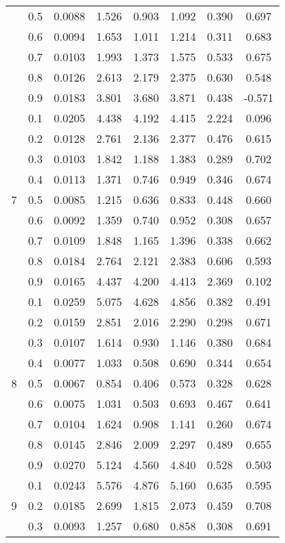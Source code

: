 \documentclass[11pt,a4paper]{report}
\begin{document}
\begin{longtable}{ | c | c || c | c | c | c | c | c | }
 & 0.5 & 0.0088 & 1.526 & 0.903 & 1.092 & 0.390 & 0.697 \\
 & 0.6 & 0.0094 & 1.653 & 1.011 & 1.214 & 0.311 & 0.683 \\
 & 0.7 & 0.0103 & 1.993 & 1.373 & 1.575 & 0.533 & 0.675 \\
 & 0.8 & 0.0126 & 2.613 & 2.179 & 2.375 & 0.630 & 0.548 \\
 & 0.9 & 0.0183 & 3.801 & 3.680 & 3.871 & 0.438 & -0.571 \\
 \hline
\multirow{9}{*}{7} & 0.1 & 0.0205 & 4.438 & 4.192 & 4.415 & 2.224 & 0.096 \\
 & 0.2 & 0.0128 & 2.761 & 2.136 & 2.377 & 0.476 & 0.615 \\
 & 0.3 & 0.0103 & 1.842 & 1.188 & 1.383 & 0.289 & 0.702 \\
 & 0.4 & 0.0113 & 1.371 & 0.746 & 0.949 & 0.346 & 0.674 \\
 & 0.5 & 0.0085 & 1.215 & 0.636 & 0.833 & 0.448 & 0.660 \\
 & 0.6 & 0.0092 & 1.359 & 0.740 & 0.952 & 0.308 & 0.657 \\
 & 0.7 & 0.0109 & 1.848 & 1.165 & 1.396 & 0.338 & 0.662 \\
 & 0.8 & 0.0184 & 2.764 & 2.121 & 2.383 & 0.606 & 0.593 \\
 & 0.9 & 0.0165 & 4.437 & 4.200 & 4.413 & 2.369 & 0.102 \\
 \hline
\multirow{9}{*}{8} & 0.1 & 0.0259 & 5.075 & 4.628 & 4.856 & 0.382 & 0.491 \\
 & 0.2 & 0.0159 & 2.851 & 2.016 & 2.290 & 0.298 & 0.671 \\
 & 0.3 & 0.0107 & 1.614 & 0.930 & 1.146 & 0.380 & 0.684 \\
 & 0.4 & 0.0077 & 1.033 & 0.508 & 0.690 & 0.344 & 0.654 \\
 & 0.5 & 0.0067 & 0.854 & 0.406 & 0.573 & 0.328 & 0.628 \\
 & 0.6 & 0.0075 & 1.031 & 0.503 & 0.693 & 0.467 & 0.641 \\
 & 0.7 & 0.0104 & 1.624 & 0.908 & 1.141 & 0.260 & 0.674 \\
 & 0.8 & 0.0145 & 2.846 & 2.009 & 2.297 & 0.489 & 0.655 \\
 & 0.9 & 0.0270 & 5.124 & 4.560 & 4.840 & 0.528 & 0.503 \\
 \hline
\multirow{9}{*}{9} & 0.1 & 0.0243 & 5.576 & 4.876 & 5.160 & 0.635 & 0.595 \\
 & 0.2 & 0.0185 & 2.699 & 1.815 & 2.073 & 0.459 & 0.708 \\
 & 0.3 & 0.0093 & 1.257 & 0.680 & 0.858 & 0.308 & 0.691 \\

\end{longtable}
\end{document}
